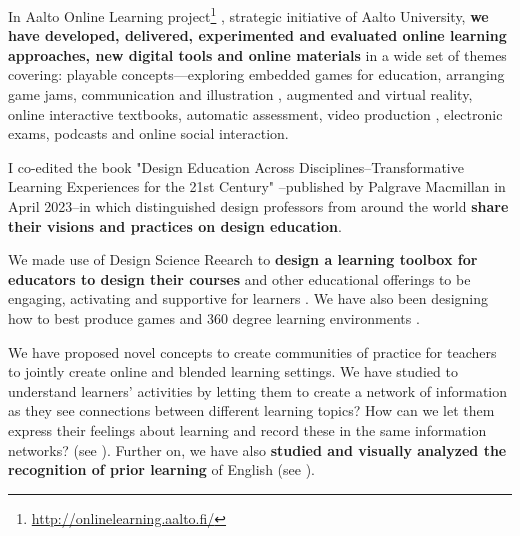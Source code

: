 \documentclass[11pt,letterpaper]{article}
\begin{document}
In Aalto Online Learning
    project\footnote{\url{http://onlinelearning.aalto.fi/}}
    \cite{aalto-online-learning-2017,transforming-uni-2018,designing-learning-2020}, strategic
    initiative of Aalto University, \textbf{we have developed, delivered, experimented and evaluated online learning approaches, new digital tools and online materials} in a wide set of themes covering:
    playable concepts---exploring embedded games for education, arranging game jams\cite{gamejams-2021}, communication and illustration \cite{playable-concepts-2020}, augmented and virtual reality, online interactive textbooks, automatic
    assessment, video production \cite{era-of-online-videos-2018}, electronic exams, podcasts  
     and online social interaction. 

I co-edited the book "Design Education Across Disciplines--Transformative Learning Experiences for the 21st Century" \cite{DesignEducation2023}--published by Palgrave Macmillan in April 2023--in which distinguished design professors from around the world \textbf{share their visions and practices on design education}.

We made use of Design Science Reearch to \textbf{design a learning toolbox for educators to design their courses} and other educational offerings to be engaging, activating and supportive for learners \cite{designing-toolbox-2022}. We have also been designing how to best produce games \cite{gamejams-2021,game-production-2022,Promotypes2023,templating-games-2024} and 360 degree learning environments \cite{production-pipeline-360}. 


We have proposed novel concepts to 
     create communities of practice for teachers to jointly create online and blended
     learning settings. We have studied to understand learners' activities by
     letting them to create a network of information as they see connections
     between different learning topics? How can we let them express their
     feelings about learning and record these in the same information networks?
     (see \cite{visual-self-assessment-2018}). Further on, we have also 
     \textbf{studied and visually analyzed the recognition of prior learning} of English
     (see \cite{rpl-test-or-assess-2019}).
\end{document}
